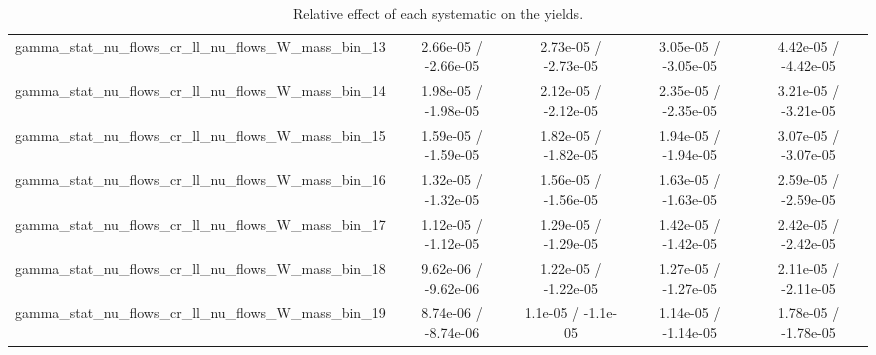 \documentclass[10pt]{article}
\begin{document}
\begin{table}[htbp]
\begin{center}
\begin{tabular}{|c|c|c|c|c|}
  gamma_stat_nu_flows_cr_ll_nu_flows_W_mass_bin_13 & 2.66e-05 / -2.66e-05 & 2.73e-05 / -2.73e-05 & 3.05e-05 / -3.05e-05 & 4.42e-05 / -4.42e-05 \\ 
  gamma_stat_nu_flows_cr_ll_nu_flows_W_mass_bin_14 & 1.98e-05 / -1.98e-05 & 2.12e-05 / -2.12e-05 & 2.35e-05 / -2.35e-05 & 3.21e-05 / -3.21e-05 \\ 
  gamma_stat_nu_flows_cr_ll_nu_flows_W_mass_bin_15 & 1.59e-05 / -1.59e-05 & 1.82e-05 / -1.82e-05 & 1.94e-05 / -1.94e-05 & 3.07e-05 / -3.07e-05 \\ 
  gamma_stat_nu_flows_cr_ll_nu_flows_W_mass_bin_16 & 1.32e-05 / -1.32e-05 & 1.56e-05 / -1.56e-05 & 1.63e-05 / -1.63e-05 & 2.59e-05 / -2.59e-05 \\ 
  gamma_stat_nu_flows_cr_ll_nu_flows_W_mass_bin_17 & 1.12e-05 / -1.12e-05 & 1.29e-05 / -1.29e-05 & 1.42e-05 / -1.42e-05 & 2.42e-05 / -2.42e-05 \\ 
  gamma_stat_nu_flows_cr_ll_nu_flows_W_mass_bin_18 & 9.62e-06 / -9.62e-06 & 1.22e-05 / -1.22e-05 & 1.27e-05 / -1.27e-05 & 2.11e-05 / -2.11e-05 \\ 
  gamma_stat_nu_flows_cr_ll_nu_flows_W_mass_bin_19 & 8.74e-06 / -8.74e-06 & 1.1e-05 / -1.1e-05 & 1.14e-05 / -1.14e-05 & 1.78e-05 / -1.78e-05 \\ 
\hline 
\end{tabular} 
\caption{Relative effect of each systematic on the yields.} 
\end{center} 
\end{table} 
\end{document}

